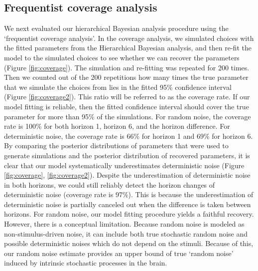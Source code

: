 \documentclass[12pt]{article}
\begin{document}
	\subsection{Frequentist coverage analysis}	
	We next evaluated our hierarchical Bayesian analysis procedure using the `frequentist coverage analysis'. In the coverage analysis, we simulated choices with the fitted parameters from the Hierarchical Bayesian analysis, and then re-fit the model to the simulated choices to see whether we can recover the parameters (Figure \ref{fig:coverage}). The simulation and re-fitting was repeated for 200 times. Then we counted out of the 200 repetitions how many times the true parameter that we simulate the choices from lies in the fitted 95\% confidence interval (Figure \ref{fig:coverage2}). This ratio will be referred to as the coverage rate. If our model fitting is reliable, then the fitted confidence interval should cover the true parameter for more than 95\% of the simulations. For random noise, the coverage rate is 100\% for both horizon 1, horizon 6, and the horizon difference. For deterministic noise, the coverage rate is 66\% for horizon 1 and 69\% for horizon 6. By comparing the posterior distributions of parameters that were used to generate simulations and the posterior distribution of recovered parameters, it is clear that our model systematically underestimates deterministic noise (Figure \ref{fig:coverage},  \ref{fig:coverage2}). Despite the underestimation of deterministic noise in both horizons, we could still reliably detect the horizon changes of deterministic noise (coverage rate is 97\%). This is because the underestimation of deterministic noise is partially canceled out when the difference is taken between horizons. For random noise, our model fitting procedure yields a faithful recovery. However, there is a conceptual limitation. Because random noise is modeled as non-stimulus-driven noise, it can include both true stochastic random noise and possible deterministic noises which do not depend on the stimuli. Because of this, our random noise estimate provides an upper bound of true `random noise' induced by intrinsic stochastic processes in the brain.
	
\end{document}
